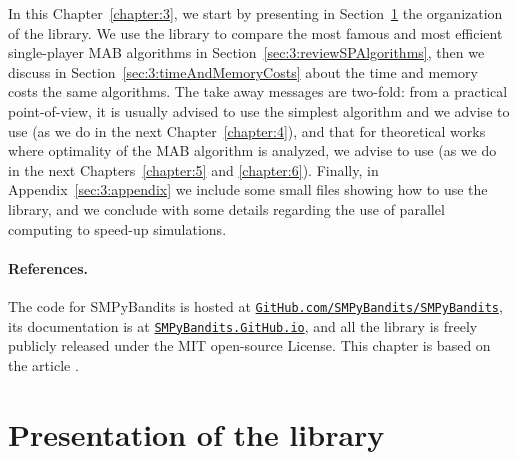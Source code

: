 In this Chapter~\ref{chapter:3}, we start by presenting in Section~\ref{sec:3:presentationLibrary} the organization of the library.
We use the library to compare the most famous and most efficient single-player MAB algorithms in Section~\ref{sec:3:reviewSPAlgorithms},
then we discuss in Section~\ref{sec:3:timeAndMemoryCosts} about the time and memory costs the same algorithms.
The take away messages are two-fold:
from a practical point-of-view, it is usually advised to use the simplest algorithm and we advise to use \UCB{} (as we do in the next Chapter~\ref{chapter:4}),
and that for theoretical works where optimality of the MAB algorithm is analyzed, we advise to use \klUCB{} (as we do in the next Chapters~\ref{chapter:5} and \ref{chapter:6}).
%
Finally, in Appendix~\ref{sec:3:appendix} we include some small files showing how to use the library, and we conclude with some details regarding the use of parallel computing to speed-up simulations.


\paragraph{References.}
%
The code for SMPyBandits is hosted at \texttt{\href{https://GitHub.com/SMPyBandits/SMPyBandits/}{GitHub.com/SMPyBandits/SMPyBandits}}, its documentation is at \texttt{\href{https://SMPyBandits.GitHub.io/}{SMPyBandits.GitHub.io}}, and all the library is freely publicly released under the MIT open-source License.
This chapter is based on the article \cite{SMPyBanditsJMLR}.


\section{Presentation of the library}
\label{sec:3:presentationLibrary}


